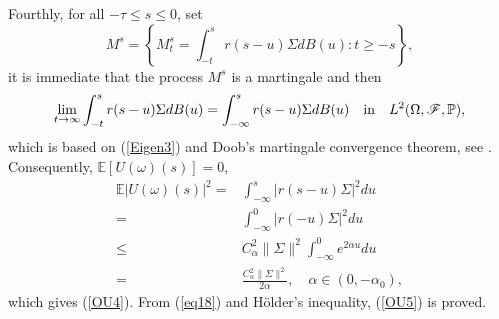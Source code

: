 \documentclass[preprint,12pt]{elsarticle}
\begin{document}
Fourthly, for all $-\tau\leq s\leq0$, set
\[M^s=\left\{M_t^s=\int_{-t}^{s}r(s-u)\Sigma dB(u):t\geq-s\right\},\]
it is immediate that the process $M^s$ is a martingale and then
\[\lim_{t\rightarrow\infty}\int_{-t}^{s}r(s-u)\Sigma dB(u)=\int_{-\infty}^{s}r(s-u)\Sigma dB(u)\quad {\rm in}\quad L^2(\Omega,\mathscr{F},\mathbb{P}),\]
which is based on (\ref{Eigen3}) and Doob's martingale convergence theorem, see {\rm \cite[Problem 3.20 in Chap. 1]{KS}}. Consequently, $\mathbb{E}[U(\omega)(s)]=0$,
\begin{align}\label{eq18}
\mathbb{E}|U(\omega)(s)|^2=&\int_{-\infty}^{s}\left|r(s-u)\Sigma\right|^2du\nonumber\\
=&\int_{-\infty}^{0}\left|r(-u)\Sigma\right|^2du\nonumber\\
\leq&C_\alpha^2\|\Sigma\|^2\int_{-\infty}^{0}e^{2\alpha u}du\nonumber\\
=&\frac{C_\alpha^2\|\Sigma\|^2}{2\alpha},\quad \alpha\in(0,-\alpha_0),
\end{align}
which gives (\ref{OU4}). From (\ref{eq18}) and H\"{o}lder's inequality, (\ref{OU5}) is proved.
\end{document}
